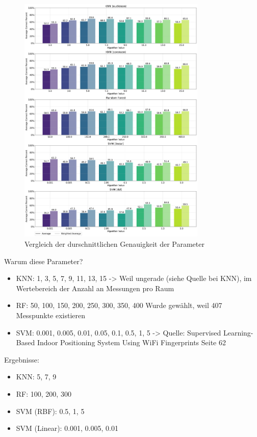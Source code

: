 \begin{figure}[H]
    \centering
    \includegraphics[width=0.8\textwidth]{images/2_best_parameters_02.png}
    \caption{Vergleich der durschnittlichen Genauigkeit der Parameter}
    \label{fig:2_best_parameters_02}
\end{figure}

Warum diese Parameter?
\begin{itemize}
    \item KNN: 1, 3, 5, 7, 9, 11, 13, 15 -> Weil ungerade (siehe Quelle bei KNN), im Wertebereich der Anzahl an Messungen pro Raum
    \item RF: 50, 100, 150, 200, 250, 300, 350, 400 Wurde gewählt, weil 407 Messpunkte existieren
    \item SVM: 0.001, 0.005, 0.01, 0.05, 0.1, 0.5, 1, 5 -> Quelle: Supervised Learning-Based Indoor Positioning System Using WiFi Fingerprints Seite 62
\end{itemize}

Ergebnisse:

\begin{itemize}
    \item KNN: 5, 7, 9
    \item RF: 100, 200, 300
    \item SVM (RBF): 0.5, 1, 5
    \item SVM (Linear): 0.001, 0.005, 0.01
\end{itemize}


